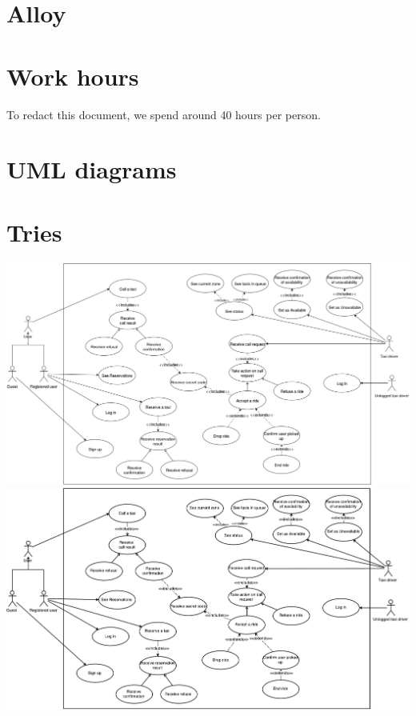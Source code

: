 \begin{appendices}
\chapter{Alloy}


\chapter{Work hours}
To redact this document, we spend around 40 hours per person.

\chapter{UML diagrams}



\chapter{Tries}
\begin{landscape}
    \includegraphics[width=850pt, keepaspectratio]{files/index.png}
    \label{fig:PropProf}
	\includegraphics{files/use_case.pdf}
\end{landscape}
    

\label{fig:PropProf}


\end{appendices}

